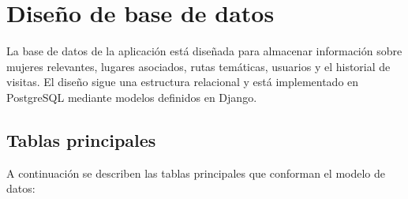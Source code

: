 

\section{Diseño de base de datos}

La base de datos de la aplicación está diseñada para almacenar información sobre mujeres relevantes, lugares asociados, rutas temáticas, usuarios y el historial de visitas. El diseño sigue una estructura relacional y está implementado en PostgreSQL mediante modelos definidos en Django.

\subsection{Tablas principales}

A continuación se describen las tablas principales que conforman el modelo de datos:

